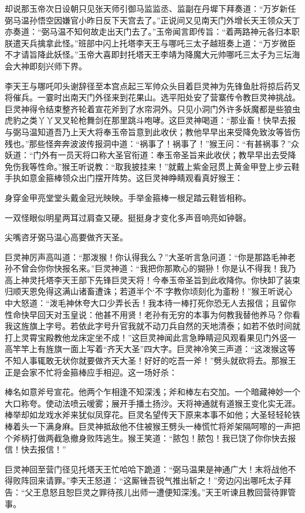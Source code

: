 \documentclass[12pt,UTF8]{ctexbook}
\begin{document}
却说那玉帝次日设朝只见张天师引御马监监丞、监副在丹墀下拜奏道：“万岁新任弼马温孙悟空因嫌官小昨日反下天宫去了。”正说间又见南天门外增长天王领众天丁亦奏道：“弼马温不知何故走出天门去了。”玉帝闻言即传旨：“着两路神元各归本职朕遣天兵擒拿此怪。”班部中闪上托塔李天王与哪吒三太子越班奏上道：“万岁微臣不才请旨降此妖怪。”玉帝大喜即封托塔天王李靖为降魔大元帅哪吒三太子为三坛海会大神即刻兴师下界。

李天王与哪吒叩头谢辞径至本宫点起三军帅众头目着巨灵神为先锋鱼肚将掠后药叉将催兵。一霎时出南天门外径来到花果山。选平阳处安了营寨传令教巨灵神挑战。巨灵神得令结束整齐轮着宣花斧到了水帘洞外。只见小洞门外许多妖魔都是些狼虫虎豹之类丫丫叉叉轮枪舞剑在那里跳斗咆哮。这巨灵神喝道：“那业畜！快早去报与弼马温知道吾乃上天大将奉玉帝旨意到此收伏；教他早早出来受降免致汝等皆伤残也。”那些怪奔奔波波传报洞中道：“祸事了！祸事了！”猴王问：“有甚祸事？”众妖道：“门外有一员天将口称大圣官衔道：奉玉帝圣旨来此收伏；教早早出去受降免伤我等性命。”猴王听说教：“取我披挂来！”就戴上紫金冠贯上黄金甲登上步云鞋手执如意金箍棒领众出门摆开阵势。这巨灵神睁睛观看真好猴王：

身穿金甲亮堂堂头戴金冠光映映。手举金箍棒一根足踏云鞋皆相称。

一双怪眼似明星两耳过肩查又硬。挺挺身才变化多声音响亮如钟磬。

尖嘴咨牙弼马温心高要做齐天圣。

巨灵神厉声高叫道：“那泼猴！你认得我么？”大圣听言急问道：“你是那路毛神老孙不曾会你你快报名来。”巨灵神道：“我把你那欺心的猢狲！你是认不得我！我乃高上神灵托塔李天王部下先锋巨灵天将！今奉玉帝圣旨到此收降你。你快卸了装束归顺天恩免得这满山诸畜遭诛；若道半个‘不’字教你顷刻化为齑粉！”猴王听说心中大怒道：“泼毛神休夸大口少弄长舌！我本待一棒打死你恐无人去报信；且留你性命快早回天对玉皇说：他甚不用贤！老孙有无穷的本事为何教我替他养马？你看我这旌旗上字号。若依此字号升官我就不动刀兵自然的天地清泰；如若不依时间就打上灵霄宝殿教他龙床定坐不成！”这巨灵神闻此言急睁睛迎风观看果见门外竖一高竿竿上有旌旗一面上写着“齐天大圣”四大字。巨灵神冷笑三声道：“这泼猴这等不知人事辄敢无状你就要做齐天大圣！好好的吃吾一斧！”劈头就砍将去。那猴王正是会家不忙将金箍棒应手相迎。这一场好杀：

棒名如意斧号宣花。他两个乍相逢不知深浅；斧和棒左右交加。一个暗藏神妙一个大口称夸。使动法喷云嗳雾；展开手播土扬沙。天将神通就有道猴王变化实无涯。棒举却如龙戏水斧来犹似凤穿花。巨灵名望传天下原来本事不如他；大圣轻轻轮铁棒着头一下满身麻。巨灵神抵敌他不住被猴王劈头一棒慌忙将斧架隔呵嚓的一声把个斧柄打做两截急撤身败阵逃生。猴王笑道：“脓包！脓包！我已饶了你你快去报信！快去报信！”

巨灵神回至营门径见托塔天王忙哈哈下跪道：“弼马温果是神通广大！末将战他不得败阵回来请罪。”李天王怒道：“这厮锉吾锐气推出斩之！”旁边闪出哪吒太子拜告：“父王息怒且恕巨灵之罪待孩儿出师一遭便知深浅。”天王听谏且教回营待罪管事。
\end{document}

